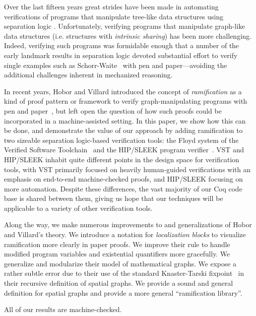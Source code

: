 Over the last fifteen years great strides have been made in automating verifications of programs that manipulate
tree-like data structures using separation logic 
\cite{berdine:smallfoot,chin:hipsleek,jacobs:verifast,chlipala:bedrock,bengtson:charge,appel:programlogics}.  Unfortunately, verifying programs that manipulate graph-like data structures (i.e. structures with \emph{intrinsic sharing}) has been more challenging.  Indeed, verifying such programs was formidable enough that a number of the early landmark results in separation logic devoted substantial effort to verify single examples such as Schorr-Waite~\cite{hongseok:phd} with pen and paper---avoiding the additional challenges inherent in mechanized reasoning.

In recent years, Hobor and Villard introduced the concept of \emph{ramification} as a kind of proof pattern or framework to verify graph-manipulating programs with pen and paper~\cite{hobor:ramification}, but left open the question of how such proofs could be incorporated in a machine-assisted setting.  In this paper, we show how this can be done, and demonstrate the value of our approach by adding ramification to two sizeable separation logic-based verification tools: the Floyd system of the Verified Software Toolchain~\cite{appel:programlogics} and the HIP/SLEEK program verifier~\cite{chin:hipsleek}.  VST and HIP/SLEEK inhabit quite different points in the design space for verification tools, with VST primarily focused on heavily human-guided verifications with an emphasis on end-to-end machine-checked proofs, and HIP/SLEEK focusing on more automation.  Despite these differences, the vast majority of our Coq code base is shared between them,
giving us hope that our techniques will be applicable to a variety of other verification tools.

Along the way, we make numerous improvements to and generalizations of Hobor and Villard's theory.  We introduce a notation for \emph{localization blocks} to visualize ramification more clearly in paper proofs.  We improve their  rule to handle modified program variables and existential quantifiers more gracefully.  We generalize and modularize their model of mathematical graphs.  We expose a rather subtle error due to their use of the standard Knaster-Tarski fixpoint~\cite{tarski:fixpoint} in their recursive definition of spatial graphs.  We provide a sound and general definition for spatial graphs and provide a more general ``ramification library''.

All of our results are machine-checked. %

